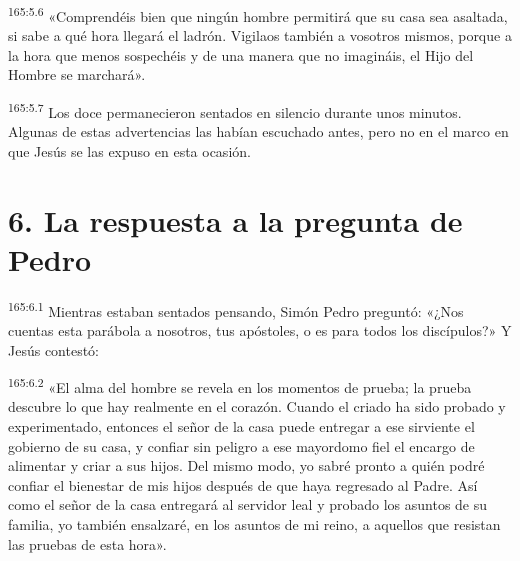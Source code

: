 \par 
\textsuperscript{165:5.6} «Comprendéis bien que ningún hombre permitirá que su casa sea asaltada, si sabe a qué hora llegará el ladrón. Vigilaos también a vosotros mismos, porque a la hora que menos sospechéis y de una manera que no imagináis, el Hijo del Hombre se marchará».

\par 
\textsuperscript{165:5.7} Los doce permanecieron sentados en silencio durante unos minutos. Algunas de estas advertencias las habían escuchado antes, pero no en el marco en que Jesús se las expuso en esta ocasión.

\section*{6. La respuesta a la pregunta de Pedro}
\par 
\textsuperscript{165:6.1} Mientras estaban sentados pensando, Simón Pedro preguntó: «¿Nos cuentas esta parábola a nosotros, tus apóstoles, o es para todos los discípulos?» Y Jesús contestó:

\par 
\textsuperscript{165:6.2} «El alma del hombre se revela en los momentos de prueba; la prueba descubre lo que hay realmente en el corazón. Cuando el criado ha sido probado y experimentado, entonces el señor de la casa puede entregar a ese sirviente el gobierno de su casa, y confiar sin peligro a ese mayordomo fiel el encargo de alimentar y criar a sus hijos. Del mismo modo, yo sabré pronto a quién podré confiar el bienestar de mis hijos después de que haya regresado al Padre. Así como el señor de la casa entregará al servidor leal y probado los asuntos de su familia, yo también ensalzaré, en los asuntos de mi reino, a aquellos que resistan las pruebas de esta hora».


